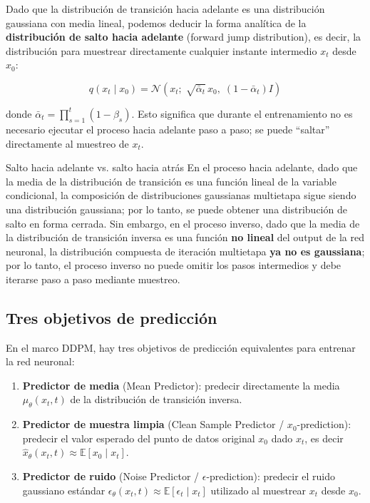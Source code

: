 Dado que la distribución de transición hacia adelante es una distribución gaussiana con media lineal, podemos deducir la forma analítica de la \textbf{distribución de salto hacia adelante} (forward jump distribution), es decir, la distribución para muestrear directamente cualquier instante intermedio $x_t$ desde $x_0$:

$$q(x_t \mid x_0) = \mathcal{N}(x_t;\; \sqrt{\bar{\alpha}_t}\, x_0,\; (1-\bar{\alpha}_t) I)$$

donde $\bar{\alpha}_t = \prod_{s=1}^{t}(1-\beta_s)$. Esto significa que durante el entrenamiento no es necesario ejecutar el proceso hacia adelante paso a paso; se puede ``saltar'' directamente al muestreo de $x_t$.

\begin{knowledgebox}{Salto hacia adelante vs. salto hacia atrás}
En el proceso hacia adelante, dado que la media de la distribución de transición es una función lineal de la variable condicional, la composición de distribuciones gaussianas multietapa sigue siendo una distribución gaussiana; por lo tanto, se puede obtener una distribución de salto en forma cerrada. Sin embargo, en el proceso inverso, dado que la media de la distribución de transición inversa es una función \textbf{no lineal} del output de la red neuronal, la distribución compuesta de iteración multietapa \textbf{ya no es gaussiana}; por lo tanto, el proceso inverso no puede omitir los pasos intermedios y debe iterarse paso a paso mediante muestreo.
\end{knowledgebox}

\subsection{Tres objetivos de predicción}

En el marco DDPM, hay tres objetivos de predicción equivalentes para entrenar la red neuronal:

\begin{enumerate}
    \item \textbf{Predictor de media} (Mean Predictor): predecir directamente la media $\mu_\theta(x_t, t)$ de la distribución de transición inversa.
    \item \textbf{Predictor de muestra limpia} (Clean Sample Predictor / $x_0$-prediction): predecir el valor esperado del punto de datos original $x_0$ dado $x_t$, es decir $\hat{x}_\theta(x_t, t) \approx \mathbb{E}[x_0 \mid x_t]$.
    \item \textbf{Predictor de ruido} (Noise Predictor / $\epsilon$-prediction): predecir el ruido gaussiano estándar $\epsilon_\theta(x_t, t) \approx \mathbb{E}[\epsilon_t \mid x_t]$ utilizado al muestrear $x_t$ desde $x_0$.
\end{enumerate}

